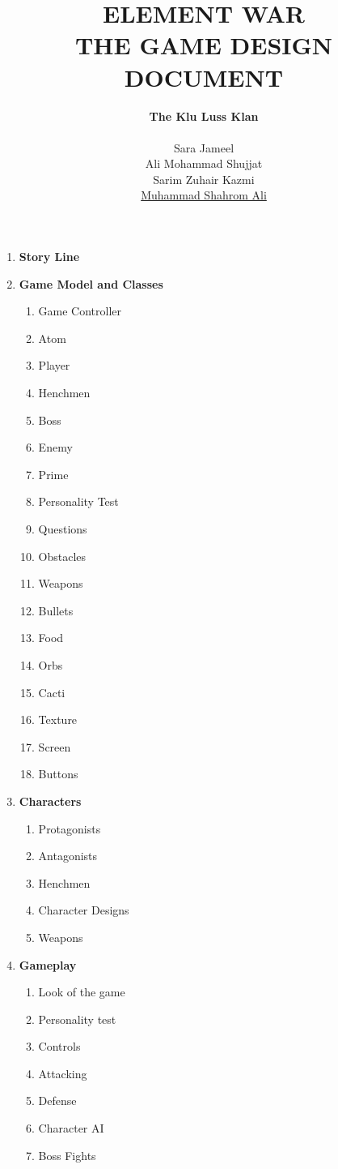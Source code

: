 \documentclass[a4paper, 11pt]{report}
\title{ELEMENT WAR \\ THE GAME DESIGN DOCUMENT}
\author{ \textbf{The Klu Luss Klan} \\ \\ Sara Jameel \\ Ali Mohammad Shujjat \\ Sarim Zuhair Kazmi \\ \underline{Muhammad Shahrom Ali}}
\begin{document}
	\setlength{\parskip}{10pt} %
	\setlength{\parindent}{0pt}
	\maketitle

	\begin{enumerate}

		\item \textbf{Story Line}
		\item \textbf{Game Model and Classes}
			\begin{enumerate}
				\item Game Controller 
				\item Atom
				\item Player
				\item Henchmen 
				\item Boss
				\item Enemy
				\item Prime
				\item Personality Test
				\item Questions
				\item Obstacles
				\item Weapons 
				\item Bullets
				\item Food 
				\item Orbs
				\item Cacti
				\item Texture
				\item Screen
				\item Buttons
			\end{enumerate}
		\item \textbf{Characters}
			\begin{enumerate}
				\item Protagonists	
				\item Antagonists 
				\item Henchmen
				\item Character Designs
				\item Weapons
			\end{enumerate}
		\item \textbf{Gameplay}
			\begin{enumerate}
				\item Look of the game
				\item Personality test 
				\item Controls
				\item Attacking 
				\item Defense 
				\item Character AI
				\item Boss Fights
			\end{enumerate}

	\end{enumerate}
\end{document}
